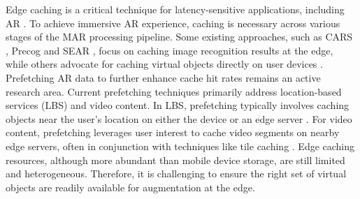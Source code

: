 
    

 
    Edge caching is a critical technique for latency-sensitive applications, including AR \cite{bib:cachecompar, bib:cachemec,bib:onlinecoll, bib:arvrcache, bib:artactile}.  To achieve immersive AR experience, caching is necessary across various stages of the MAR processing pipeline.  Some existing approaches, such as CARS \cite{bib:carsar}, Precog \cite{bib:precog} and SEAR \cite{bib:sear}, focus on caching image recognition results at the edge, while others advocate for caching virtual objects directly on user devices \cite{bib:localcache}.  Prefetching AR data to further enhance cache hit rates remains an active research area.  Current prefetching techniques primarily address location-based services (LBS) and video content.  In LBS, prefetching typically involves caching objects near the user's location on either the device or an edge server \cite{bib:dreamstore, bib:locar,bib:advlocar}.  For video content, prefetching leverages user interest to cache video segments on nearby edge servers, often in conjunction with techniques like tile caching \cite{bib:explorevr, bib:cubist, bib:coopec, bib:tile}. Edge caching resources, although more abundant than mobile device storage, are still limited and heterogeneous. Therefore, it is challenging to ensure the right set of virtual objects are readily available for augmentation at the edge.
    
